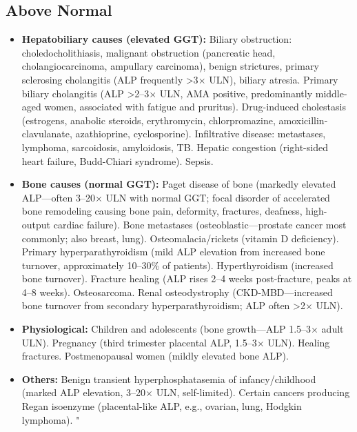 \subsection*{Above Normal}
\begin{itemize}
  \item \textbf{Hepatobiliary causes (elevated GGT):} Biliary obstruction: choledocholithiasis, malignant obstruction (pancreatic head, cholangiocarcinoma, ampullary carcinoma), benign strictures, primary sclerosing cholangitis (ALP frequently >3$\times$ ULN), biliary atresia. Primary biliary cholangitis (ALP >2--3$\times$ ULN, AMA positive, predominantly middle-aged women, associated with fatigue and pruritus). Drug-induced cholestasis (estrogens, anabolic steroids, erythromycin, chlorpromazine, amoxicillin-clavulanate, azathioprine, cyclosporine). Infiltrative disease: metastases, lymphoma, sarcoidosis, amyloidosis, TB. Hepatic congestion (right-sided heart failure, Budd-Chiari syndrome). Sepsis.
  \item \textbf{Bone causes (normal GGT):} Paget disease of bone (markedly elevated ALP---often 3--20$\times$ ULN with normal GGT; focal disorder of accelerated bone remodeling causing bone pain, deformity, fractures, deafness, high-output cardiac failure). Bone metastases (osteoblastic---prostate cancer most commonly; also breast, lung). Osteomalacia/rickets (vitamin D deficiency). Primary hyperparathyroidism (mild ALP elevation from increased bone turnover, approximately 10--30\% of patients). Hyperthyroidism (increased bone turnover). Fracture healing (ALP rises 2--4 weeks post-fracture, peaks at 4--8 weeks). Osteosarcoma. Renal osteodystrophy (CKD-MBD---increased bone turnover from secondary hyperparathyroidism; ALP often >2$\times$ ULN).
  \item \textbf{Physiological:} Children and adolescents (bone growth---ALP 1.5--3$\times$ adult ULN). Pregnancy (third trimester placental ALP, 1.5--3$\times$ ULN). Healing fractures. Postmenopausal women (mildly elevated bone ALP).
  \item \textbf{Others:} Benign transient hyperphosphatasemia of infancy/childhood (marked ALP elevation, 3--20$\times$ ULN, self-limited). Certain cancers producing Regan isoenzyme (placental-like ALP, e.g., ovarian, lung, Hodgkin lymphoma). "
\end{itemize}

